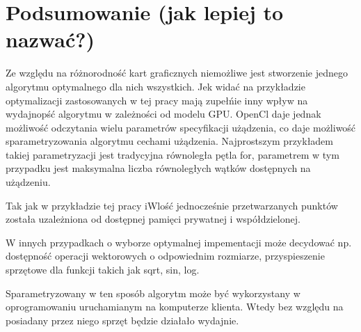 
\section{Podsumowanie (jak lepiej to nazwać?)}

Ze względu na różnorodność kart graficznych niemożliwe jest stworzenie jednego algorytmu optymalnego dla nich wszystkich. Jek widać na przykładzie optymalizacji zastosowanych w tej pracy mają zupełńie inny wpływ na wydajnopść algorytmu w zależności od modelu GPU. OpenCl daje jednak możliwość odczytania wielu parametrów specyfikacji użądzenia, co daje możliwość sparametryzowania algorytmu cechami użądzenia. Najprostszym przykładem takiej parametryzacji jest tradycyjna równoległa pętla for, parametrem w tym przypadku jest maksymalna liczba równoległych wątków dostępnych na użądzeniu.
\linebreak

Tak jak w przykładzie tej pracy iWlość jednocześnie przetwarzanych punktów została uzależniona od dostępnej pamięci prywatnej i współdzielonej.
\linebreak

W innych przypadkach o wyborze optymalnej impementacji może decydować np. dostępność operacji wektorowych o odpowiednim rozmiarze, przyspieszenie sprzętowe dla funkcji takich jak sqrt, sin, log.

Sparametryzowany w ten sposób algorytm może być wykorzystany w oprogramowaniu uruchamianym na komputerze klienta. Wtedy bez względu na posiadany przez niego sprzęt będzie działało wydajnie.
\linebreak



